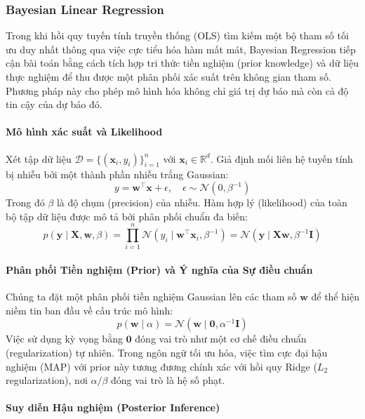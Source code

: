 \subsubsection{Bayesian Linear Regression}

Trong khi hồi quy tuyến tính truyền thống (OLS) tìm kiếm một bộ tham số tối ưu duy nhất thông qua việc cực tiểu hóa hàm mất mát, Bayesian Regression tiếp cận bài toán bằng cách tích hợp tri thức tiền nghiệm (prior knowledge) và dữ liệu thực nghiệm để thu được một phân phối xác suất trên không gian tham số. Phương pháp này cho phép mô hình hóa không chỉ giá trị dự báo mà còn cả độ tin cậy của dự báo đó.

\paragraph{Mô hình xác suất và Likelihood}

Xét tập dữ liệu $\mathcal{D} = \{(\boldsymbol{x}_i, y_i)\}_{i=1}^n$ với $\boldsymbol{x}_i \in \mathbb{R}^d$. Giả định mối liên hệ tuyến tính bị nhiễu bởi một thành phần nhiễu trắng Gaussian:
\[
y = \boldsymbol{w}^\intercal \boldsymbol{x} + \epsilon, \quad \epsilon \sim \mathcal{N}(0, \beta^{-1})
\]
Trong đó $\beta$ là độ chụm (precision) của nhiễu. Hàm hợp lý (likelihood) của toàn bộ tập dữ liệu được mô tả bởi phân phối chuẩn đa biến:
\[
p(\boldsymbol{y} \mid \boldsymbol{X}, \boldsymbol{w}, \beta) = \prod_{i=1}^n \mathcal{N}(y_i \mid \boldsymbol{w}^\intercal \boldsymbol{x}_i, \beta^{-1}) = \mathcal{N}(\boldsymbol{y} \mid \boldsymbol{X}\boldsymbol{w}, \beta^{-1}\boldsymbol{I})
\]

\paragraph{Phân phối Tiền nghiệm (Prior) và Ý nghĩa của Sự điều chuẩn}

Chúng ta đặt một phân phối tiền nghiệm Gaussian lên các tham số $\boldsymbol{w}$ để thể hiện niềm tin ban đầu về cấu trúc mô hình:
\[
p(\boldsymbol{w} \mid \alpha) = \mathcal{N}(\boldsymbol{w} \mid \boldsymbol{0}, \alpha^{-1}\boldsymbol{I})
\]
Việc sử dụng kỳ vọng bằng $\boldsymbol{0}$ đóng vai trò như một cơ chế điều chuẩn (regularization) tự nhiên. Trong ngôn ngữ tối ưu hóa, việc tìm cực đại hậu nghiệm (MAP) với prior này tương đương chính xác với hồi quy Ridge ($L_2$ regularization), nơi $\alpha/\beta$ đóng vai trò là hệ số phạt.

\paragraph{Suy diễn Hậu nghiệm (Posterior Inference)}

